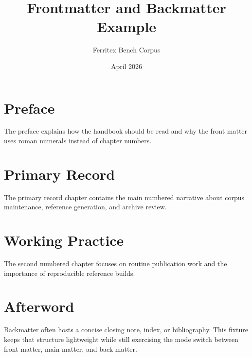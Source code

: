 \documentclass{book}
\title{Frontmatter and Backmatter Example}
\author{Ferritex Bench Corpus}
\date{April 2026}
\begin{document}
\frontmatter
\maketitle
\chapter{Preface}
The preface explains how the handbook should be read and why the front matter
uses roman numerals instead of chapter numbers.

\tableofcontents

\mainmatter
\chapter{Primary Record}
The primary record chapter contains the main numbered narrative about corpus
maintenance, reference generation, and archive review.

\chapter{Working Practice}
The second numbered chapter focuses on routine publication work and the
importance of reproducible reference builds.

\backmatter
\chapter{Afterword}
Backmatter often hosts a concise closing note, index, or bibliography. This
fixture keeps that structure lightweight while still exercising the mode
switch between front matter, main matter, and back matter.
\end{document}
